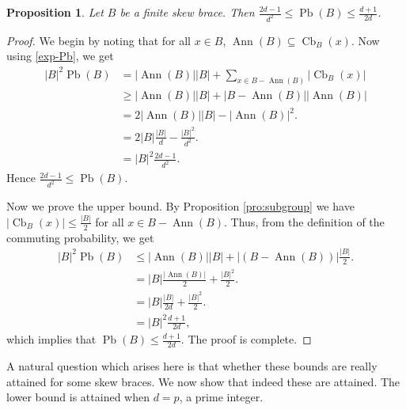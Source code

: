 \documentclass[oneside]{amsart}
\numberwithin{equation}{section}
\theoremstyle{plain}
\newtheorem{pro}[equation]{Proposition}
\theoremstyle{definition}
\newcommand{\Cb}{\operatorname{Cb} }
\newcommand{\Pb}{\operatorname{Pb} }
\newcommand{\Ann}{\operatorname{Ann} }
\begin{document}
\begin{pro}\label{thm:upper and lower}
Let $B$ be a finite skew brace.  Then $\frac{2d-1}{d^2}\leqslant \Pb(B)\leqslant \frac{d+1}{2d}$.
\end{pro}
\begin{proof}
We begin by noting that for all $x \in B$, $\Ann(B) \subseteq \Cb_B(x)$. Now using  \eqref{exp-Pb}, we get
      \begin{align*}
            |B|^2\Pb(B) &=|\Ann(B)||B|+\sum_{x\in B-\Ann(B)}|\Cb_{B}(x)|\\
                        &\geqslant |\Ann(B)||B|+|B-\Ann(B)||\Ann(B)|\\
                        &=2|\Ann(B)||B|-|\Ann(B)|^2.\\
                        &=2|B|\frac{|B|}{d}-\frac{|B|^2}{d^2}.\\
                        &=|B|^2\frac{2d-1}{d^2}.
      \end{align*}
     Hence  $\frac{2d-1}{d^2} \leqslant \Pb(B)$.

     Now we prove the upper bound. By Proposition \ref{pro:subgroup} we have $|\Cb_B(x)| \leqslant  \frac{|B|}{2}$ for all $x \in B - \Ann(B)$. Thus, from the definition of the commuting probability, we get
     \begin{align*}
            |B|^2\Pb(B)&\leqslant|\Ann(B)||B|+|(B-\Ann(B))|\frac{|B|}{2}.\\
                        &= |B|\frac{|\Ann(B)|}{2}+\frac{|B|^2}{2}.\\
                        &= |B|\frac{|B|}{2d}+\frac{|B|^2}{2}.\\
                        &= |B|^2\frac{d+1}{2d},
      \end{align*}                  
      which implies that  $\Pb(B)\leqslant \frac{d+1}{2d}$. The proof is complete.
\end{proof}

A natural question which arises here is that whether these bounds are really attained for some skew braces.  We now show that indeed these are attained. The lower bound is attained when $d=p$, a prime integer.
\end{document}
